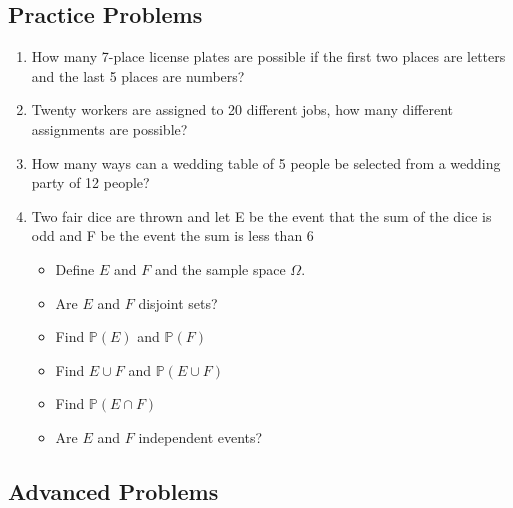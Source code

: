 \documentclass[
]{book}
\providecommand{\tightlist}{%
  \setlength{\itemsep}{0pt}\setlength{\parskip}{0pt}}
\newcommand{\prob}[1]{{\mathbb{P}(#1)}}
\theoremstyle{definition}
\theoremstyle{definition}
\theoremstyle{definition}
\theoremstyle{definition}
\theoremstyle{remark}
\begin{document}
\hypertarget{practice-problems-4}{%
\subsection{Practice Problems}\label{practice-problems-4}}

\begin{enumerate}
\def\labelenumi{\arabic{enumi}.}
\item
  How many 7-place license plates are possible if the first two places are letters and the last 5 places are numbers?
\item
  Twenty workers are assigned to 20 different jobs, how many different assignments are possible?
\item
  How many ways can a wedding table of 5 people be selected from a wedding party of 12 people?
\item
  Two fair dice are thrown and let E be the event that the sum of the dice is odd and F be the event the sum is less than 6

  \begin{itemize}
  \tightlist
  \item
    Define \(E\) and \(F\) and the sample space \(\Omega\).
  \item
    Are \(E\) and \(F\) disjoint sets?
  \item
    Find \(\prob{E}\) and \(\prob{F}\)
  \item
    Find \(E \cup F\) and \(\prob{E\cup F}\)
  \item
    Find \(\prob{E \cap F}\)
  \item
    Are \(E\) and \(F\) independent events?
  \end{itemize}
\end{enumerate}

\hypertarget{advanced-problems-4}{%
\subsection{Advanced Problems}\label{advanced-problems-4}}
\end{document}
